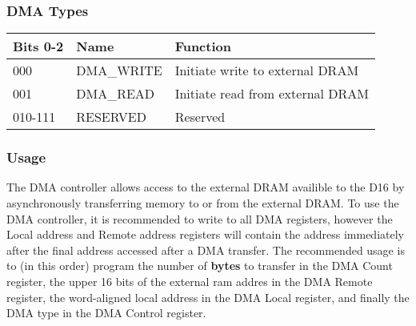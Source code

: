 \documentclass{article}
\begin{document}
        \subsubsection{DMA Types}
        \begin{tabular}{|l|l|l|}
          \hline
          Bits 0-2 & Name & Function \\ \hline
          000 & DMA\_WRITE & Initiate write to external DRAM \\ \hline
          001 & DMA\_READ & Initiate read from external DRAM \\ \hline
          010-111 & RESERVED & Reserved \\ \hline
        \end{tabular}
        \subsubsection{Usage}
        The DMA controller allows access to the external DRAM availible to the
        D16 by asynchronously transferring memory to or from the external DRAM.
        To use the DMA controller, it is recommended to write to all DMA
        registers, however the Local address and Remote address registers will
        contain the address immediately after the final address accessed after a
        DMA transfer. The recommended usage is to (in this order) program the
        number of \textbf{bytes} to transfer in the DMA Count register, the
        upper 16 bits of the external ram addres in the DMA Remote register, the
        word-aligned local address in the DMA Local register, and finally the
        DMA type in the DMA Control register.
        
        
\end{document}
